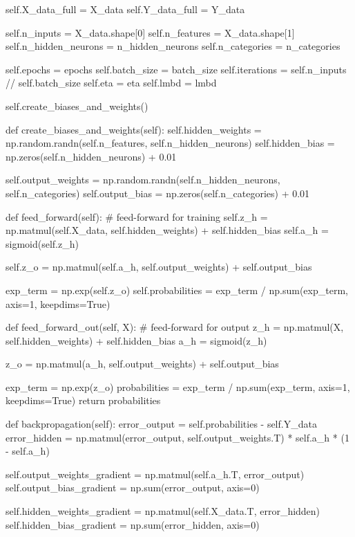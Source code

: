 \documentclass[%
oneside,                 %
final,                   %
10pt]{article}
\begin{document}
        self.X_data_full = X_data
        self.Y_data_full = Y_data

        self.n_inputs = X_data.shape[0]
        self.n_features = X_data.shape[1]
        self.n_hidden_neurons = n_hidden_neurons
        self.n_categories = n_categories

        self.epochs = epochs
        self.batch_size = batch_size
        self.iterations = self.n_inputs // self.batch_size
        self.eta = eta
        self.lmbd = lmbd

        self.create_biases_and_weights()

    def create_biases_and_weights(self):
        self.hidden_weights = np.random.randn(self.n_features, self.n_hidden_neurons)
        self.hidden_bias = np.zeros(self.n_hidden_neurons) + 0.01

        self.output_weights = np.random.randn(self.n_hidden_neurons, self.n_categories)
        self.output_bias = np.zeros(self.n_categories) + 0.01

    def feed_forward(self):
        # feed-forward for training
        self.z_h = np.matmul(self.X_data, self.hidden_weights) + self.hidden_bias
        self.a_h = sigmoid(self.z_h)

        self.z_o = np.matmul(self.a_h, self.output_weights) + self.output_bias

        exp_term = np.exp(self.z_o)
        self.probabilities = exp_term / np.sum(exp_term, axis=1, keepdims=True)

    def feed_forward_out(self, X):
        # feed-forward for output
        z_h = np.matmul(X, self.hidden_weights) + self.hidden_bias
        a_h = sigmoid(z_h)

        z_o = np.matmul(a_h, self.output_weights) + self.output_bias
        
        exp_term = np.exp(z_o)
        probabilities = exp_term / np.sum(exp_term, axis=1, keepdims=True)
        return probabilities

    def backpropagation(self):
        error_output = self.probabilities - self.Y_data
        error_hidden = np.matmul(error_output, self.output_weights.T) * self.a_h * (1 - self.a_h)

        self.output_weights_gradient = np.matmul(self.a_h.T, error_output)
        self.output_bias_gradient = np.sum(error_output, axis=0)

        self.hidden_weights_gradient = np.matmul(self.X_data.T, error_hidden)
        self.hidden_bias_gradient = np.sum(error_hidden, axis=0)
\end{document}
